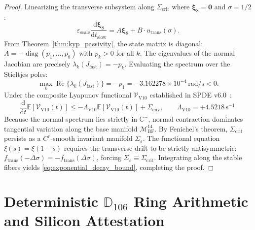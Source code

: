 \documentclass[11pt,a4paper,reqno]{article}
\theoremstyle{plain}
\theoremstyle{definition}
\theoremstyle{remark}
\numberwithin{equation}{section}
\providecommand{\diff}{\mathrm{d}}
\begin{document}
\begin{proof}
Linearizing the transverse subsystem along $\Sigma_{\mathrm{crit}}$ where $\bm{\xi}_8 = \bm{0}$ and $\sigma = 1/2$:
\begin{equation}
  \varepsilon_{\mathrm{scale}} \frac{\diff\bm{\xi}_8}{\diff t_{\mathrm{slow}}} = A \bm{\xi}_8 + B \cdot u_{\mathrm{trans}}(\sigma).
\end{equation}
From Theorem~\ref{thm:kyp_passivity}, the state matrix is diagonal: $A = -\operatorname{diag}(p_1, \dots, p_8)$ with $p_k > 0$ for all $k$. The eigenvalues of the normal Jacobian are precisely $\lambda_k(J_{\mathrm{fast}}) = -p_k$. Evaluating the spectrum over the Stieltjes poles:
\begin{equation}
  \max_{k} \operatorname{Re}\{\lambda_k(J_{\mathrm{fast}})\} = -p_1 = -3.162278 \times 10^{-4}\,\mathrm{rad/s} < 0.
\end{equation}
Under the composite Lyapunov functional $\mathcal{V}_{\mathrm{V10}}$ established in SPDE v6.0~\cite{SPDEV60}:
\begin{equation}
  \frac{\diff}{\diff t} \mathbb{E}[\mathcal{V}_{\mathrm{V10}}(t)] \le -\Lambda_{\mathrm{V10}} \mathbb{E}[\mathcal{V}_{\mathrm{V10}}(t)] + \Sigma_{\mathrm{env}}, \qquad \Lambda_{\mathrm{V10}} = +4.5218\,\mathrm{s}^{-1}.
\end{equation}
Because the normal spectrum lies strictly in $\mathbb{C}^-$, normal contraction dominates tangential variation along the base manifold $\mathcal{M}_{\mathrm{BF}}^{14}$. By Fenichel's theorem, $\Sigma_{\mathrm{crit}}$ persists as a $C^r$-smooth invariant manifold $\Sigma_\varepsilon$. The functional equation $\xi(s) = \xi(1-s)$ requires the transverse drift to be strictly antisymmetric: $f_{\mathrm{trans}}(-\Delta\sigma) = -f_{\mathrm{trans}}(\Delta\sigma)$, forcing $\Sigma_\varepsilon \equiv \Sigma_{\mathrm{crit}}$. Integrating along the stable fibers yields \eqref{eq:exponential_decay_bound}, completing the proof.
\end{proof}

\section{Deterministic \texorpdfstring{$\mathbb{D}_{106}$}{D106} Ring Arithmetic and Silicon Attestation}
\label{sec:doubledouble_guard}
\end{document}
